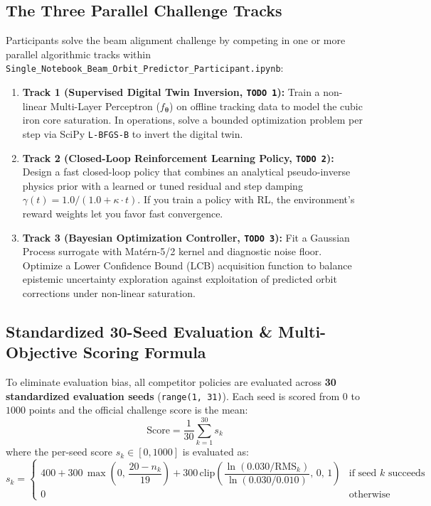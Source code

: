 \documentclass[11pt,a4paper]{article}
\begin{document}
\subsection{The Three Parallel Challenge Tracks}
Participants solve the beam alignment challenge by competing in one or more parallel algorithmic tracks within \texttt{Single\_Notebook\_Beam\_Orbit\_Predictor\_Participant.ipynb}:
\begin{enumerate}
    \item \textbf{Track 1 (Supervised Digital Twin Inversion, \texttt{TODO 1}):}
    Train a non-linear Multi-Layer Perceptron ($f_{\boldsymbol{\theta}}$) on offline tracking data to model the cubic iron core saturation. In operations, solve a bounded optimization problem per step via SciPy \texttt{L-BFGS-B} to invert the digital twin.
    
    \item \textbf{Track 2 (Closed-Loop Reinforcement Learning Policy, \texttt{TODO 2}):}
    Design a fast closed-loop policy that combines an analytical pseudo-inverse physics prior with a learned or tuned residual and step damping $\gamma(t) = 1.0 / (1.0 + \kappa \cdot t)$. If you train a policy with RL, the environment's reward weights let you favor fast convergence.
    
    \item \textbf{Track 3 (Bayesian Optimization Controller, \texttt{TODO 3}):}
    Fit a Gaussian Process surrogate with Mat\'ern-5/2 kernel and diagnostic noise floor. Optimize a Lower Confidence Bound (LCB) acquisition function to balance epistemic uncertainty exploration against exploitation of predicted orbit corrections under non-linear saturation.
\end{enumerate}

\subsection{Standardized 30-Seed Evaluation \& Multi-Objective Scoring Formula}
To eliminate evaluation bias, all competitor policies are evaluated across \textbf{30 standardized evaluation seeds} (\texttt{range(1, 31)}).
Each seed is scored from $0$ to $1000$ points and the official challenge score is the mean:
\begin{equation}
    \text{Score} = \frac{1}{30}\sum_{k=1}^{30} s_k
\end{equation}
where the per-seed score $s_k \in [0, 1000]$ is evaluated as:
\begin{equation}
    s_k = \begin{cases}
    400 + 300\,\max\!\left(0,\,\dfrac{20 - n_k}{19}\right) + 300\,\mathrm{clip}\!\left(\dfrac{\ln(0.030/\text{RMS}_k)}{\ln(0.030/0.010)},\,0,\,1\right) & \text{if seed } k \text{ succeeds} \\
    0 & \text{otherwise}
    \end{cases}
\end{equation}
\end{document}
